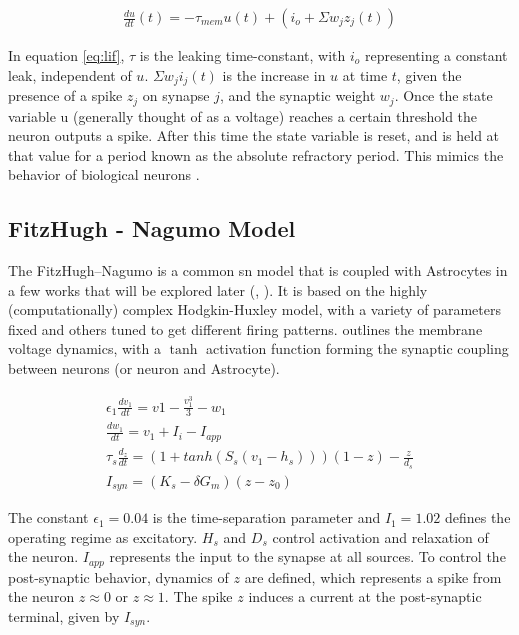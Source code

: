     \begin{align}
        \frac{du}{dt}(t) = -\tau_{mem}u(t)+(i_o + \Sigma w_jz_j(t)) \label{eq:lif}
    \end{align}
    
    In equation \ref{eq:lif}, $\tau$ is the leaking time-constant, with $i_o$
    representing a constant leak, independent of $u$. $\Sigma w_ji_j(t)$ is the
    increase in $u$ at time $t$, given the presence of a spike $z_j$ on synapse
    $j$, and the synaptic weight $w_j$. Once the state variable u (generally
    thought of as a voltage) reaches a certain threshold the neuron outputs a
    spike. After this time the state variable is reset, and is held at that
    value for a period known as the absolute refractory period. This mimics the
    behavior of biological neurons \parencite{ponulak_2011}.



    \subsection{FitzHugh - Nagumo Model}
    The FitzHugh–Nagumo is a common \Gls{sn} model that is coupled with
    Astrocytes in a few works that will be explored later (\parencite{postnov_2009},
    \parencite{postnov_2007}). It is based on the highly (computationally) complex
    Hodgkin-Huxley model, with a variety of parameters fixed and others tuned to
    get different firing patterns. \parencite{postnov_2009} outlines the membrane
    voltage dynamics, with a $\tanh$ activation function forming the synaptic
    coupling between neurons (or neuron and Astrocyte).

    \begin{align}
      \epsilon_1 \frac{dv_1}{dt} = v1 - \frac{v_1^3}{3} -
      w_1 \label{eq:fn_neuron}  \\
      \frac{dw_1}{dt} = v_1 + I_i - I_{app} \\
      \tau_s \frac{d_z}{dt} = (1 + tanh(S_s(v_1 - h_s)))(1 - z) - \frac{z}{d_s} \label{eq:fitz_nn}
      \\
      I_{syn} = (K_s - \delta G_m)(z - z_0)
    \end{align}

    The constant $\epsilon_1 = 0.04$ is the time-separation parameter and
    $I_1 = 1.02$ defines the operating regime as excitatory. $H_s$ and $D_s$
    control activation and relaxation of the neuron. $I_{app}$ represents the
    input to the synapse at all sources. To control the post-synaptic behavior,
    dynamics of $z$ are defined, which represents a spike from the neuron
    $z \approx 0$ or $z \approx 1$. The spike $z$ induces a current at the
    post-synaptic terminal, given by $I_{syn}$.

